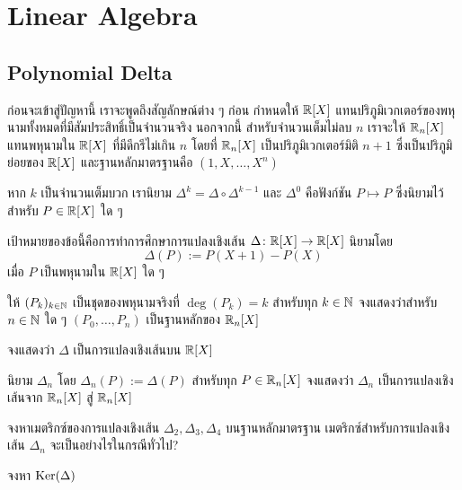 \chapter{Linear Algebra}

\renewcommand{\ker}{\rm{Ker}}
\newcommand{\im}{\rm{Im}}

\section{Polynomial Delta}

ก่อนจะเข้าสู่ปัญหานี้ เราจะพูดถึงสัญลักษณ์ต่าง ๆ ก่อน กำหนดให้ $\mathbb{R}[X]$ แทนปริภูมิเวกเตอร์ของพหุนามทั้งหมดที่มีสัมประสิทธิ์เป็นจำนวนจริง นอกจากนี้ สำหรับจำนวนเต็มไม่ลบ $n$ เราจะให้ $\mathbb{R}_n[X]$ แทนพหุนามใน $\mathbb{R}[X]$ ที่มีดีกรีไม่เกิน $n$ โดยที่ $\mathbb{R}_n[X]$ เป็นปริภูมิเวกเตอร์มิติ $n+1$ ซึ่งเป็นปริภูมิย่อยของ $\mathbb{R}[X]$ และฐานหลักมาตรฐานคือ $(1, X, \dots, X^n)$

หาก $k$ เป็นจำนวนเต็มบวก เรานิยาม $\Delta^k = \Delta \circ \Delta^{k-1}$ และ $\Delta^0$ คือฟังก์ชัน $P \mapsto P$ ซึ่งนิยามไว้สำหรับ $P \in \mathbb{R}[X]$ ใด ๆ

เป้าหมายของข้อนี้คือการทำการศึกษาการแปลงเชิงเส้น $\Delta \colon \mathbb{R}[X] \to \mathbb{R}[X]$ นิยามโดย
\[
\Delta(P) := P(X+1) - P(X)
\]
เมื่อ $P$ เป็นพหุนามใน $\mathbb{R}[X]$ ใด ๆ

\begin{exercise}
ให้ $(P_k)_{k \in \mathbb{N}}$ เป็นชุดของพหุนามจริงที่ $\deg(P_k) = k$ สำหรับทุก $k \in \mathbb{N}$ จงแสดงว่าสำหรับ $n \in \mathbb{N}$ ใด ๆ $(P_0, \dots, P_n)$ เป็นฐานหลักของ $\mathbb{R}_n[X]$
\end{exercise}

\begin{exercise}
จงแสดงว่า $\Delta$ เป็นการแปลงเชิงเส้นบน $\mathbb{R}[X]$
\end{exercise}

\begin{exercise}
นิยาม $\Delta_n$ โดย $\Delta_n(P) := \Delta(P)$ สำหรับทุก $P \in \mathbb{R}_n[X]$ จงแสดงว่า $\Delta_n$ เป็นการแปลงเชิงเส้นจาก $\mathbb{R}_n[X]$ สู่ $\mathbb{R}_n[X]$
\end{exercise}

\begin{exercise}
จงหาเมตริกซ์ของการแปลงเชิงเส้น $\Delta_2, \Delta_3, \Delta_4$ บนฐานหลักมาตรฐาน เมตริกซ์สำหรับการแปลงเชิงเส้น $\Delta_n$ จะเป็นอย่างไรในกรณีทั่วไป?
\end{exercise}

\begin{exercise}
จงหา $\ker(\Delta)$
\end{exercise}


